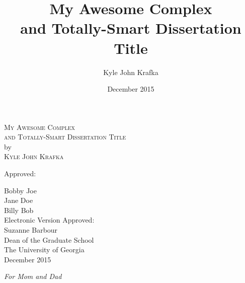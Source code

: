 \documentclass[12pt,notitlepage]{report}  %
\newcommand{\dissertationtitle}{My Awesome Complex\\and Totally-Smart Dissertation Title}
\newcommand{\whoami}{Kyle John Krafka}
\begin{document}
\newpage
\thispagestyle{empty}
\vspace*{18pt}
\begin{center}
\textsc{\large{\dissertationtitle}}\\[18pt]
by\\[18pt]
\textsc{\whoami}
\end{center}
\vfill
\begin{flushleft}\singlespacing
\hskip 200pt {Approved:}\\
\vskip 12pt

\hspace*{200pt}Bobby Joe\\
\vskip 12pt
\hspace*{200pt}Jane Doe\\
\hspace*{200pt}\makebox[100pt][l]{~                }Billy Bob\\
\vfill
Electronic Version Approved:\\[12pt]
Suzanne Barbour\\
Dean of the Graduate School\\
The University of Georgia\\
December 2015
\end{flushleft}

\title{\textbf{\dissertationtitle}}
\author{\whoami}
\date{December 2015}
\maketitle
\thispagestyle{empty}

\newpage
\vspace*{1.5in}
\begin{center}
\emph{For Mom and Dad}\\
\vspace{1cm}
\end{center}



\tableofcontents
\listoffigures  %
\listoftables %
\clearpage
{}







\begin{appendices}
	
\end{appendices}

\newpage


\end{document}
